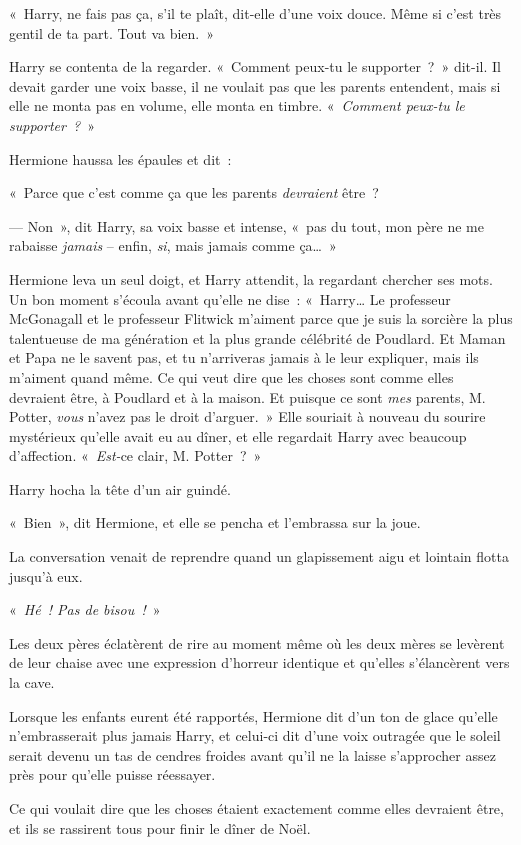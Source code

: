 «~Harry, ne fais pas ça, s'il te plaît, dit-elle d'une voix douce. Même si c'est très gentil de ta part. Tout va bien.~»

Harry se contenta de la regarder. «~Comment peux-tu le supporter~?~» dit-il. Il devait garder une voix basse, il ne voulait pas que les parents entendent, mais si elle ne monta pas en volume, elle monta en timbre. «~\emph{Comment peux-tu le supporter~?}~»

Hermione haussa les épaules et dit~:

«~Parce que c'est comme ça que les parents \emph{devraient} être~?

--- Non~», dit Harry, sa voix basse et intense, «~pas du tout, mon père ne me rabaisse \emph{jamais} -- enfin, \emph{si}, mais jamais comme ça…~»

Hermione leva un seul doigt, et Harry attendit, la regardant chercher ses mots. Un bon moment s'écoula avant qu'elle ne dise~: «~Harry… Le professeur McGonagall et le professeur Flitwick m'aiment parce que je suis la sorcière la plus talentueuse de ma génération et la plus grande célébrité de Poudlard. Et Maman et Papa ne le savent pas, et tu n'arriveras jamais à le leur expliquer, mais ils m'aiment quand même. Ce qui veut dire que les choses sont comme elles devraient être, à Poudlard et à la maison. Et puisque ce sont \emph{mes} parents, M. Potter, \emph{vous} n'avez pas le droit d'arguer.~» Elle souriait à nouveau du sourire mystérieux qu'elle avait eu au dîner, et elle regardait Harry avec beaucoup d'affection. «~\emph{Est-}ce clair, M. Potter~?~»

Harry hocha la tête d'un air guindé.

«~Bien~», dit Hermione, et elle se pencha et l'embrassa sur la joue.

\later

La conversation venait de reprendre quand un glapissement aigu et lointain flotta jusqu'à eux.

«~\emph{Hé~! Pas de bisou~!}~»

Les deux pères éclatèrent de rire au moment même où les deux mères se levèrent de leur chaise avec une expression d'horreur identique et qu'elles s'élancèrent vers la cave.

Lorsque les enfants eurent été rapportés, Hermione dit d'un ton de glace qu'elle n'embrasserait plus jamais Harry, et celui-ci dit d'une voix outragée que le soleil serait devenu un tas de cendres froides avant qu'il ne la laisse s'approcher assez près pour qu'elle puisse réessayer.

Ce qui voulait dire que les choses étaient exactement comme elles devraient être, et ils se rassirent tous pour finir le dîner de Noël.

